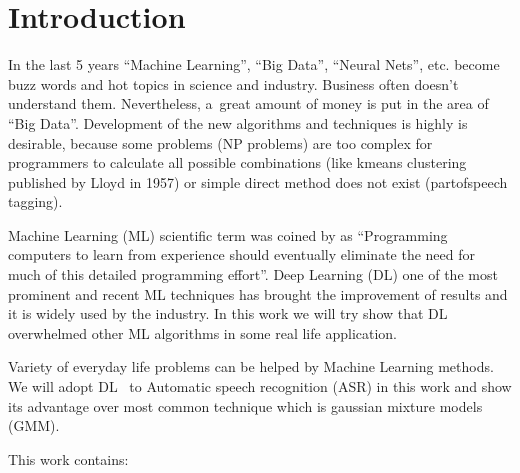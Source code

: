 
\chapter{Introduction}
In the last 5 years ``Machine Learning'', ``Big Data'', ``Neural Nets'', etc. become buzz words and hot topics in science and industry. Business often doesn't understand them. Nevertheless, a~great amount of money is put in the area of ``Big Data''. Development of the new algorithms and techniques is highly is desirable, because some problems (NP problems) are too complex for programmers to calculate all possible combinations (like k\dywiz means clustering published by Lloyd in 1957) or simple direct method does not exist (part\dywiz of\dywiz speech tagging).  

Machine Learning (ML) scientific term was coined by \textcite{samuel} as ``Programming computers to learn from experience should eventually eliminate the need for much of this detailed programming effort''. Deep Learning (DL) one of the most prominent and recent ML techniques has brought the improvement of results and it is widely used by the industry. In this work we will try show that DL~ overwhelmed other ML algorithms in some real life application.

Variety of everyday life problems can be helped by Machine Learning methods. We will adopt DL~ to Automatic speech recognition (ASR) in this work and show its advantage over most common technique which is gaussian mixture models (GMM).

This work contains:

